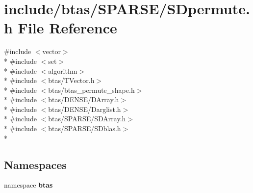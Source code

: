 \section{include/btas/\-S\-P\-A\-R\-S\-E/\-S\-Dpermute.h File Reference}
\label{d5/d38/SDpermute_8h}
{\ttfamily \#include $<$vector$>$}\\*
{\ttfamily \#include $<$set$>$}\\*
{\ttfamily \#include $<$algorithm$>$}\\*
{\ttfamily \#include $<$btas/\-T\-Vector.\-h$>$}\\*
{\ttfamily \#include $<$btas/btas\-\_\-permute\-\_\-shape.\-h$>$}\\*
{\ttfamily \#include $<$btas/\-D\-E\-N\-S\-E/\-D\-Array.\-h$>$}\\*
{\ttfamily \#include $<$btas/\-D\-E\-N\-S\-E/\-Darglist.\-h$>$}\\*
{\ttfamily \#include $<$btas/\-S\-P\-A\-R\-S\-E/\-S\-D\-Array.\-h$>$}\\*
{\ttfamily \#include $<$btas/\-S\-P\-A\-R\-S\-E/\-S\-Dblas.\-h$>$}\\*
\subsection*{Namespaces}
\begin{DoxyCompactItemize}
\item 
namespace {\bf btas}
\end{DoxyCompactItemize}
